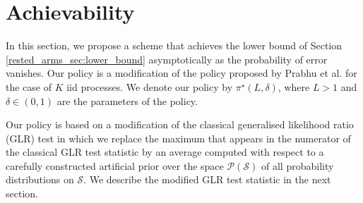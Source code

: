 
\section{Achievability}\label{rested_arms_sec:achievability}
In this section, we propose a scheme that achieves the lower bound of Section \ref{rested_arms_sec:lower_bound} asymptotically as the probability of error vanishes. Our policy is a modification of the policy proposed by Prabhu et al. \cite{prabhu2017learning} for the case of $K$ iid processes. We denote our policy by $\pi^\star(L,\delta)$, where $L>1$ and $\delta\in(0,1)$ are the parameters of the policy.

Our policy is based on a modification of the classical generalised likelihood ratio (GLR) test in which we replace the maximum that appears in the numerator of the classical GLR test statistic by an average computed with respect to a carefully constructed artificial prior over the space $\mathcal{P}(\mathcal{S})$ of all probability distributions on $\mathcal{S}$. We describe the modified GLR test statistic in the next section.

